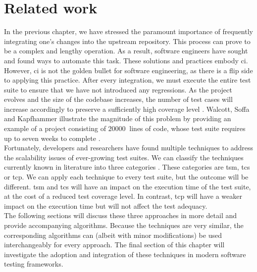 
\chapter{Related work}
\label{ch:related-work}

In the previous chapter, we have stressed the paramount importance of frequently integrating one's changes into the upstream repository. This process can prove to be a complex and lengthy operation. As a result, software engineers have sought and found ways to automate this task. These solutions and practices embody \acrfull{ci}. However, \acrshort{ci} is not the golden bullet for software engineering, as there is a flip side to applying this practice. After every integration, we must execute the entire test suite to ensure that we have not introduced any regressions. As the project evolves and the size of the codebase increases, the number of test cases will increase accordingly to preserve a sufficiently high coverage level \cite{evaluationoftestsuiteminimization}. Walcott, Soffa and Kapfhammer illustrate the magnitude of this problem by providing an example of a project consisting of $\SI{20000}{}$ lines of code, whose test suite requires up to seven weeks to complete \cite{10.1145/1146238.1146240}.\\

\noindent Fortunately, developers and researchers have found multiple techniques to address the scalability issues of ever-growing test suites. We can classify the techniques currently known in literature into three categories \cite{evaluationoftestsuiteminimization}. These categories are \acrfull{tsm}, \acrfull{tcs} or \acrfull{tcp}. We can apply each technique to every test suite, but the outcome will be different. \acrshort{tsm} and \acrshort{tcs} will have an impact on the execution time of the test suite, at the cost of a reduced test coverage level. In contrast, \acrshort{tcp} will have a weaker impact on the execution time but will not affect the test adequacy.\\

\noindent The following sections will discuss these three approaches in more detail and provide accompanying algorithms. Because the techniques are very similar, the corresponding algorithms can (albeit with minor modifications) be used interchangeably for every approach. The final section of this chapter will investigate the adoption and integration of these techniques in modern software testing frameworks.\\

\clearpage

\clearpage

\clearpage
